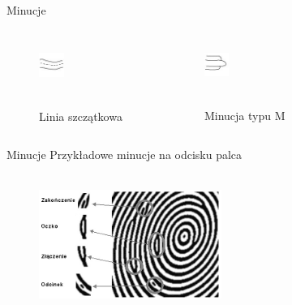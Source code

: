 \documentclass{beamer}
\begin{document}
\begin{frame}{Minucje}
    \begin{columns}
            \begin{figure}[t]
			    \centering
                \includegraphics[width=0.3\textwidth]{fingerprints/minucje/linia_szczatkowa.jpg}\\~\
                \caption*{Linia szczątkowa}
            \end{figure}
            \begin{figure}[t]
			    \centering
                \includegraphics[width=0.3\textwidth]{fingerprints/minucje/minucja_m.jpg}\\~\
                \caption*{Minucja typu M}
            \end{figure}
    \end{columns}
\end{frame}

\begin{frame}{Minucje}
    \centering
    Przykładowe minucje na odcisku palca \\~\
    \smallskip
    \begin{figure}[t]
        \includegraphics[width=0.53\textwidth]{fingerprints/minucje/minucje.jpg}
    \end{figure}
\end{frame}
\end{document}
